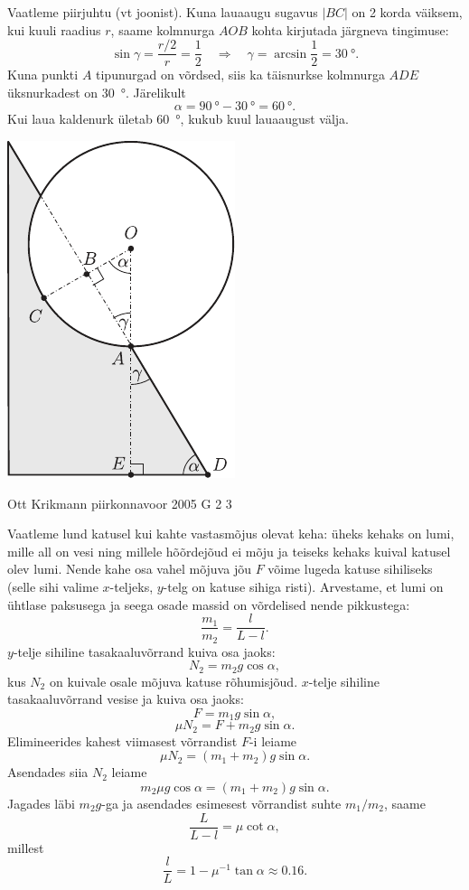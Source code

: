 \documentclass[11pt, twoside]{article}
\begin{document}
{{Vaatleme piirjuhtu (vt joonist). Kuna lauaaugu sugavus $|BC|$ on 2 korda väiksem, kui kuuli raadius $r$, saame kolmnurga $AOB$ kohta kirjutada järgneva tingimuse:
\[
\sin \gamma=\frac{r / 2}{r}=\frac{1}{2} \quad \Rightarrow \quad \gamma=\arcsin \frac{1}{2}=\SI{30}{\degree}.
\]
Kuna punkti $A$ tipunurgad on võrdsed, siis ka täisnurkse kolmnurga $ADE$ üksnurkadest on \SI{30}{\degree}. Järelikult
\[
\alpha = \SI{90}{\degree} - \SI{30}{\degree} = \SI{60}{\degree}.
\]
Kui laua kaldenurk ületab \SI{60}{\degree}, kukub kuul lauaaugust välja.
\begin{center}
	\includegraphics[width=0.35\linewidth]{2005-lahg-03-lah}
\end{center}
\fi
}

{Ott Krikmann} %
{piirkonnavoor} %
{2005} %
{G 2} %
{3} %
{

\ifSolution
Vaatleme lund katusel kui kahte vastasmõjus olevat keha: üheks kehaks on lumi, mille all on vesi ning millele hõõrdejõud ei mõju ja teiseks kehaks kuival katusel olev lumi. Nende kahe osa vahel mõjuva jõu $F$ võime lugeda katuse sihiliseks (selle sihi valime $x$-teljeks, $y$-telg on katuse sihiga risti). Arvestame, et lumi on ühtlase paksusega ja seega osade massid on võrdelised nende pikkustega: 
\[
\frac{m_1}{m_2} = \frac{l}{L-l}.
\]
$y$-telje sihiline tasakaaluvõrrand kuiva osa jaoks:
\[
N_2 = m_2g \cos \alpha,
\]
kus $N_2$ on kuivale osale mõjuva katuse rõhumisjõud. $x$-telje sihiline tasakaaluvõrrand vesise ja kuiva osa jaoks:
\[
F = m_1g \sin \alpha,
\]
\[
\mu N_2 = F + m_2g \sin \alpha.
\]
Elimineerides kahest viimasest võrrandist $F$-i leiame
\[
\mu N_2 = (m_1 + m_2) g \sin \alpha.
\]
Asendades siia $N_2$ leiame
\[
m_2\mu g \cos \alpha = (m_1 + m_2) g \sin \alpha.
\]
Jagades läbi $m_2g$-ga ja asendades esimesest võrrandist suhte $m_1/m_2$, saame
\[
\frac{L}{L-l}=\mu \cot \alpha,
\]
millest
\[
\frac{l}{L}=1-\mu^{-1} \tan \alpha \approx \num{0,16}.
\]

}}
\end{document}
